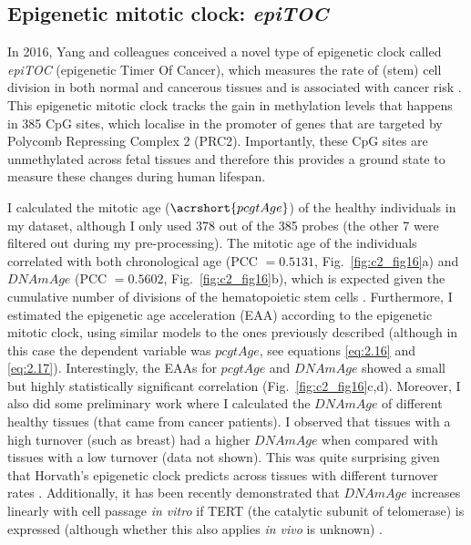 \subsection{Epigenetic mitotic clock: \textit{epiTOC}} \label{s:2.3.2}

In 2016, Yang and colleagues conceived a novel type of epigenetic clock called \textit{\acrshort{epiTOC}} (epigenetic Timer Of Cancer), which measures the rate of (stem) cell division in both normal and cancerous tissues and is associated with cancer risk \citep{Yang2016}. This epigenetic mitotic clock tracks the gain in methylation levels that happens in 385 CpG sites, which localise in the promoter of genes that are targeted by Polycomb Repressing Complex 2 (\acrshort{PRC2}). Importantly, these CpG sites are unmethylated across fetal tissues and therefore this provides a ground state to measure these changes during human lifespan.

\bigskip

I calculated the mitotic age ($\acrshort{pcgtAge}$) of the healthy individuals in my dataset, although I only used 378 out of the 385 probes (the other 7 were filtered out during my pre-processing). The mitotic age of the individuals correlated with both chronological age (PCC $= 0.5131$, Fig.~\ref{fig:c2_fig16}a) and $DNAmAge$ (PCC $= 0.5602$, Fig.~\ref{fig:c2_fig16}b), which is expected given the cumulative number of divisions of the hematopoietic stem cells \citep{Beerman2013}. Furthermore, I estimated the epigenetic age acceleration (EAA) according to the epigenetic mitotic clock, using similar models to the ones previously described (although in this case the dependent variable was $pcgtAge$, see equations \ref{eq:2.16} and \ref{eq:2.17}). Interestingly, the EAAs for $pcgtAge$ and $DNAmAge$ showed a small but highly statistically significant correlation (Fig.~\ref{fig:c2_fig16}c,d). Moreover, I also did some preliminary work where I calculated the $DNAmAge$ of different healthy tissues (that came from cancer patients). I observed that tissues with a high turnover (such as breast) \citep{Horvath2013,Sehl2017} had a higher $DNAmAge$ when compared with tissues with a low turnover (data not shown). This was quite surprising given that Horvath's epigenetic clock predicts across tissues with different turnover rates \citep{Yang2016}. Additionally, it has been recently demonstrated that $DNAmAge$ increases linearly with cell passage \textit{in vitro} if TERT (the catalytic subunit of telomerase) is expressed (although whether this also applies \textit{in vivo} is unknown) \citep{Lu2018}. 

